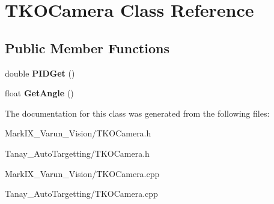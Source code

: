 \hypertarget{class_t_k_o_camera}{\section{T\-K\-O\-Camera Class Reference}
\label{class_t_k_o_camera}
}
\subsection*{Public Member Functions}
\begin{DoxyCompactItemize}
\item 
\hypertarget{class_t_k_o_camera_a6f548d053fbb799924b99e5795addbdb}{double {\bfseries P\-I\-D\-Get} ()}\label{class_t_k_o_camera_a6f548d053fbb799924b99e5795addbdb}

\item 
\hypertarget{class_t_k_o_camera_af13110a52d21c440ceab5bdf2cb6de59}{float {\bfseries Get\-Angle} ()}\label{class_t_k_o_camera_af13110a52d21c440ceab5bdf2cb6de59}

\end{DoxyCompactItemize}


The documentation for this class was generated from the following files\-:\begin{DoxyCompactItemize}
\item 
Mark\-I\-X\-\_\-\-Varun\-\_\-\-Vision/T\-K\-O\-Camera.\-h\item 
Tanay\-\_\-\-Auto\-Targetting/T\-K\-O\-Camera.\-h\item 
Mark\-I\-X\-\_\-\-Varun\-\_\-\-Vision/T\-K\-O\-Camera.\-cpp\item 
Tanay\-\_\-\-Auto\-Targetting/T\-K\-O\-Camera.\-cpp\end{DoxyCompactItemize}
